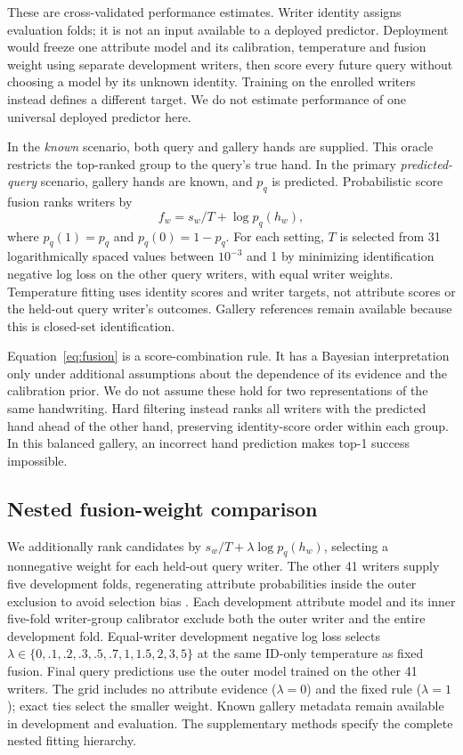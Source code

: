 \documentclass[ASNA,twocolumn]{USG}
\begin{document}
These are cross-validated performance estimates. Writer identity assigns evaluation folds; it is not an input available to a deployed predictor. Deployment would freeze one attribute model and its calibration, temperature and fusion weight using separate development writers, then score every future query without choosing a model by its unknown identity. Training on the enrolled writers instead defines a different target. We do not estimate performance of one universal deployed predictor here.

In the \emph{known} scenario, both query and gallery hands are supplied. This oracle restricts the top-ranked group to the query's true hand. In the primary \emph{predicted-query} scenario, gallery hands are known, and $p_q$ is predicted. Probabilistic score fusion ranks writers by
\begin{equation}
 f_w=s_w/T+\log p_q(h_w),
 \label{eq:fusion}
\end{equation}
where $p_q(1)=p_q$ and $p_q(0)=1-p_q$. For each setting, $T$ is selected from 31 logarithmically spaced values between $10^{-3}$ and 1 by minimizing identification negative log loss on the other query writers, with equal writer weights. Temperature fitting uses identity scores and writer targets, not attribute scores or the held-out query writer's outcomes. Gallery references remain available because this is closed-set identification.

Equation~\eqref{eq:fusion} is a score-combination rule. It has a Bayesian interpretation only under additional assumptions about the dependence of its evidence and the calibration prior. We do not assume these hold for two representations of the same handwriting. Hard filtering instead ranks all writers with the predicted hand ahead of the other hand, preserving identity-score order within each group. In this balanced gallery, an incorrect hand prediction makes top-1 success impossible.

\subsection{Nested fusion-weight comparison}
\label{sec:nested}
We additionally rank candidates by $s_w/T+\lambda\log p_q(h_w)$, selecting a nonnegative weight for each held-out query writer. The other 41 writers supply five development folds, regenerating attribute probabilities inside the outer exclusion to avoid selection bias \cite{cawley2010selection}. Each development attribute model and its inner five-fold writer-group calibrator exclude both the outer writer and the entire development fold. Equal-writer development negative log loss selects $\lambda\in\{0,.1,.2,.3,.5,.7,1,1.5,2,3,5\}$ at the same ID-only temperature as fixed fusion. Final query predictions use the outer model trained on the other 41 writers. The grid includes no attribute evidence ($\lambda=0$) and the fixed rule ($\lambda=1$); exact ties select the smaller weight. Known gallery metadata remain available in development and evaluation. The supplementary methods specify the complete nested fitting hierarchy.
\end{document}
